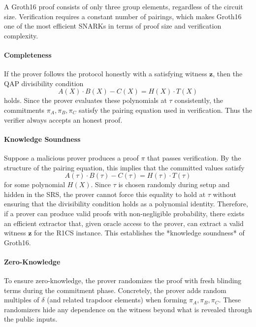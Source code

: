 \myspace

\begin{remark}[Succinctness]
A Groth16 proof consists of only three group elements, regardless of 
the circuit size.  
Verification requires a constant number of pairings, which makes 
Groth16 one of the most efficient SNARKs in terms of proof size and 
verification complexity.
\end{remark}


\paragraph{Completeness}
If the prover follows the protocol honestly with a satisfying witness $\mathbf{z}$, 
then the QAP divisibility condition
\[
A(X) \cdot B(X) - C(X) = H(X) \cdot T(X)
\]
holds.  
Since the prover evaluates these polynomials at $\tau$ consistently, 
the commitments $\pi_A, \pi_B, \pi_C$ satisfy the pairing equation used in verification.  
Thus the verifier always accepts an honest proof.

\paragraph{Knowledge Soundness}
Suppose a malicious prover produces a proof $\pi$ that passes verification.  
By the structure of the pairing equation, this implies that the committed values satisfy
\[
A(\tau) \cdot B(\tau) - C(\tau) = H(\tau) \cdot T(\tau)
\]
for some polynomial $H(X)$.  
Since $\tau$ is chosen randomly during setup and hidden in the SRS, the prover cannot force this equality to hold at $\tau$ without ensuring that the divisibility condition holds as a polynomial identity.  
Therefore, if a prover can produce valid proofs with non-negligible probability, there exists an efficient extractor that, given oracle access to the prover, can extract a valid witness $\mathbf{z}$ for the R1CS instance.  
This establishes the *knowledge soundness* of Groth16.

\paragraph{Zero-Knowledge}
To ensure zero-knowledge, the prover randomizes the proof with fresh blinding terms during the commitment phase.  
Concretely, the prover adds random multiples of $\delta$ (and related trapdoor elements) when forming 
$\pi_A, \pi_B, \pi_C$.  
These randomizers hide any dependence on the witness beyond what is revealed through the public inputs.  


